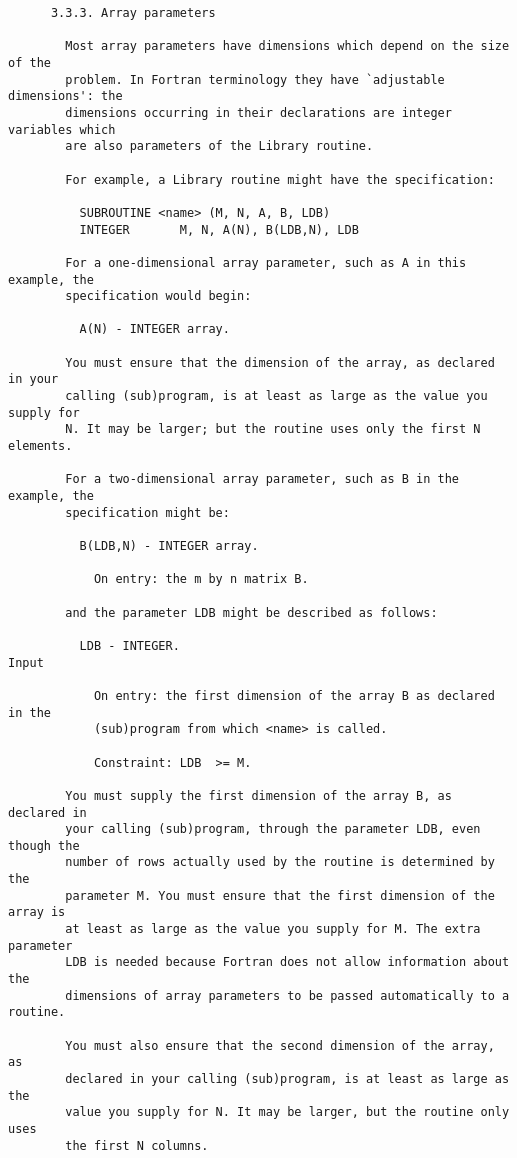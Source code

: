 \begin{small}
\begin{verbatim}
      3.3.3. Array parameters

        Most array parameters have dimensions which depend on the size of the
        problem. In Fortran terminology they have `adjustable dimensions': the
        dimensions occurring in their declarations are integer variables which
        are also parameters of the Library routine.

        For example, a Library routine might have the specification:

          SUBROUTINE <name> (M, N, A, B, LDB)
          INTEGER       M, N, A(N), B(LDB,N), LDB

        For a one-dimensional array parameter, such as A in this example, the
        specification would begin:

          A(N) - INTEGER array.

        You must ensure that the dimension of the array, as declared in your
        calling (sub)program, is at least as large as the value you supply for
        N. It may be larger; but the routine uses only the first N elements.

        For a two-dimensional array parameter, such as B in the example, the
        specification might be:

          B(LDB,N) - INTEGER array.

            On entry: the m by n matrix B.

        and the parameter LDB might be described as follows:

          LDB - INTEGER.                                                 Input

            On entry: the first dimension of the array B as declared in the
            (sub)program from which <name> is called.

            Constraint: LDB  >= M.

        You must supply the first dimension of the array B, as declared in
        your calling (sub)program, through the parameter LDB, even though the
        number of rows actually used by the routine is determined by the
        parameter M. You must ensure that the first dimension of the array is
        at least as large as the value you supply for M. The extra parameter
        LDB is needed because Fortran does not allow information about the
        dimensions of array parameters to be passed automatically to a routine.

        You must also ensure that the second dimension of the array, as
        declared in your calling (sub)program, is at least as large as the
        value you supply for N. It may be larger, but the routine only uses
        the first N columns.


\end{verbatim}
\end{small}
